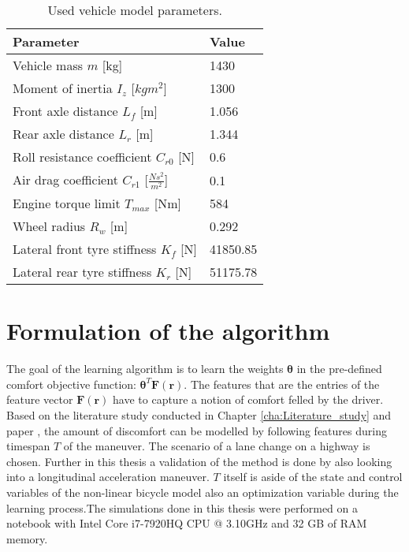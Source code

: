 \begin{table}[h]
	\centering
	\begin{tabular}{|p{5cm}|p{2cm}|}
		\hline
		\textbf{Parameter} & \textbf{Value}\\ \hline		
		Vehicle mass $m$ [kg] & 1430\\ \hline
		Moment of inertia $I_z$ [$kgm^2$] & 1300\\ \hline
		Front axle distance $L_f$ [m] & 1.056\\ \hline
		Rear axle distance $L_r$ [m] & 1.344\\ \hline
		Roll resistance coefficient $C_{r0}$ [N] & 0.6\\ \hline
		Air drag coefficient $C_{r1}$ [$\frac{Ns^2}{m^2}$] & 0.1\\ \hline
		Engine torque limit $T_{max}$ [Nm] & 584\\ \hline
		Wheel radius $R_w$ [m] & 0.292\\ \hline
		Lateral front tyre stiffness $K_{f}$ [N] & 41850.85\\ \hline
		Lateral rear tyre stiffness $K_{r}$ [N] & 51175.78\\ \hline
		
	\end{tabular}
	\caption{Used vehicle model parameters.}
	\label{table:vehicel_model_param}
\end{table}

\section{Formulation of the algorithm}
The goal of the learning algorithm is to learn the weights $\bm{\theta}$ in the pre-defined comfort objective function: $\bm{\theta}^T\bm{F}(\bm{r})$. The features that are the entries of the feature vector $\bm{F}(\bm{r})$ have to capture a notion of comfort felled by the driver. Based on the literature study conducted in Chapter \ref{cha:Literature_study} and paper \cite{Kuderer2015a}, the amount of discomfort can be modelled by following features during timespan $T$ of the maneuver. The scenario of a lane change on a highway is chosen. Further in this thesis a validation of the method is done by also looking into a longitudinal acceleration maneuver. $T$ itself is aside of the state and control variables of the non-linear bicycle model also an optimization variable during the learning process.The simulations done in this thesis were performed on a notebook with Intel Core i7-7920HQ CPU @ 3.10GHz and 32 GB of RAM memory.\\


